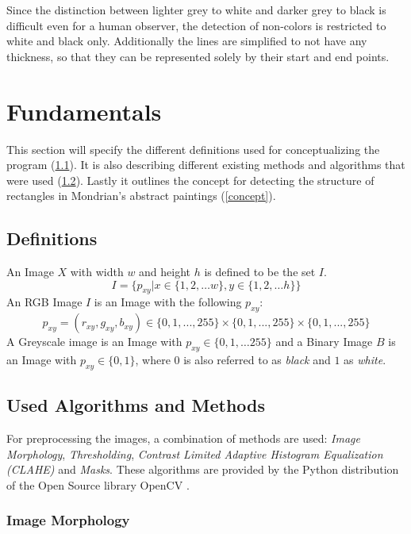 \documentclass[serif,article,noparskip]{agse-thesis}
\begin{document}
Since the distinction between lighter grey to white and darker grey to black is
difficult even for a human observer, the detection of non-colors is restricted
to white and black only. Additionally the lines are simplified to not have any
thickness, so that they can be represented solely by their start and end points.

\section{Fundamentals} \label{fundamentals}

This section will specify the different definitions used for conceptualizing the
program (\ref{definitions}). It is also describing different existing methods
and algorithms that were used (\ref{used}). Lastly it outlines the concept for
detecting the structure of rectangles in Mondrian's abstract paintings
(\ref{concept}).

\subsection{Definitions} \label{definitions}

An Image $X$ with width $w$ and height $h$ is defined to be the set $I$. $$I =
\{p_{xy} | x \in \{1,2, \dots w\}, y \in \{1,2, \dots h\} \}$$ An RGB Image $I$
is an Image with the following  $p_{xy}$: $$p_{xy} = (r_{xy}, g_{xy}, b_{xy})
\in \{0,1,...,255\} \times \{0,1,...,255\} \times\{0,1,...,255\}$$ A Greyscale
image is an Image with $p_{xy} \in \{0,1, \dots 255\}$ and a Binary Image $B$ is
an Image with $p_{xy} \in \{0,1\}$, where $0$ is also referred to as
\textit{black} and $1$ as \textit{white}.

\subsection{Used Algorithms and Methods} \label{used}

For preprocessing the images, a combination of methods are used: \textit{Image
Morphology}, \textit{Thresholding}, \textit{Contrast Limited Adaptive Histogram
Equalization (CLAHE)} and \textit{Masks}. These algorithms are provided by the
Python distribution of the Open Source library OpenCV \cite{opencv_library}.

\subsubsection{Image Morphology}
\end{document}
